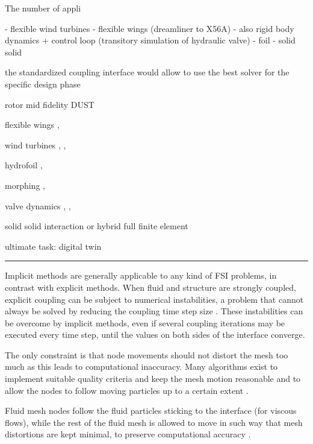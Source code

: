 The number of appli


- flexible wind turbines
- flexible wings (dreamliner to X56A)
- also rigid body dynamics + control loop (transitory simulation of hydraulic valve)
- foil
- solid solid 




the standardized coupling interface would allow to use the best solver for the specific design phase 

rotor \cite{quaranta2004toward}  \cite{cavagna2009simulation}  \cite{masarati2011coupled} mid fidelity DUST \cite{cocco2020simulation}

flexible wings \cite{pusch2019aeroelastic}, \cite{waitman2020h}

wind turbines \cite{guerri2008fluid}, \cite{rasheed2014comprehensive}, \cite{roul2020fluid} 

hydrofoil \cite{lupu2018absolute}, \cite{bousquet2017control}

morphing \cite{chanzy2018analysis}, \cite{li2018review}

valve dynamics \cite{amirante2006flow}, \cite{lisowski2013three}, \cite{frosina2017modeling}

solid solid interaction or hybrid full finite element \cite{cumnuantip2018assessment}



ultimate task: digital twin


\noindent\rule{\textwidth}{1pt}









Implicit methods are generally applicable to any kind of FSI problems, in contrast with explicit methods. When fluid and structure are strongly coupled, explicit coupling can be subject to numerical instabilities, a problem that cannot always be solved by reducing the coupling time step size \cite{van2009added}. These instabilities can be overcome by implicit methods, even if several coupling iterations may be executed every time step, until the values on both sides of the interface converge.

The only constraint is that node movements should not distort the mesh too much as this leads to computational inaccuracy. Many algorithms exist to implement suitable quality criteria and keep the mesh motion reasonable and to allow the nodes to follow moving particles up to a certain extent \cite{de2007mesh}.

Fluid mesh nodes follow the fluid particles sticking to the interface (for viscous flows), while the rest of the fluid mesh is allowed to move in such way that mesh distortions are kept minimal, to preserve computational accuracy \cite{ramm1998fluid}.




